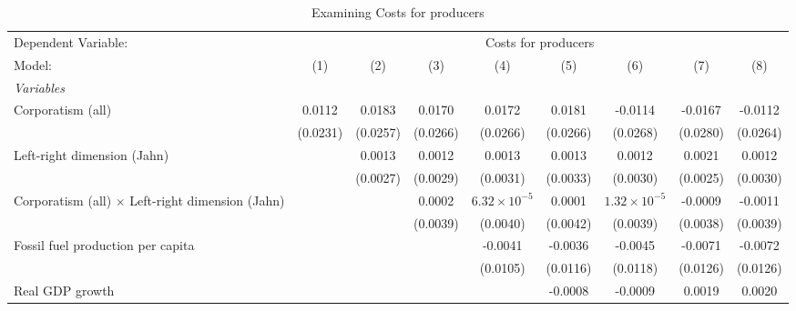 
\begin{table}[htbp]
   \caption{Examining Costs for producers}
   \centering
   \begin{tabular}{lcccccccc}
      \tabularnewline \midrule \midrule
      Dependent Variable: & \multicolumn{8}{c}{Costs for producers}\\
      Model:                                                  & (1)      & (2)      & (3)      & (4)                   & (5)      & (6)                   & (7)      & (8)\\  
      \midrule
      \emph{Variables}\\
      Corporatism (all)                                       & 0.0112   & 0.0183   & 0.0170   & 0.0172                & 0.0181   & -0.0114               & -0.0167  & -0.0112\\   
                                                              & (0.0231) & (0.0257) & (0.0266) & (0.0266)              & (0.0266) & (0.0268)              & (0.0280) & (0.0264)\\   
      Left-right dimension (Jahn)                             &          & 0.0013   & 0.0012   & 0.0013                & 0.0013   & 0.0012                & 0.0021   & 0.0012\\   
                                                              &          & (0.0027) & (0.0029) & (0.0031)              & (0.0033) & (0.0030)              & (0.0025) & (0.0030)\\   
      Corporatism (all) $\times$ Left-right dimension (Jahn)  &          &          & 0.0002   & $6.32\times 10^{-5}$  & 0.0001   & $1.32\times 10^{-5}$  & -0.0009  & -0.0011\\   
                                                              &          &          & (0.0039) & (0.0040)              & (0.0042) & (0.0039)              & (0.0038) & (0.0039)\\   
      Fossil fuel production per capita                       &          &          &          & -0.0041               & -0.0036  & -0.0045               & -0.0071  & -0.0072\\   
                                                              &          &          &          & (0.0105)              & (0.0116) & (0.0118)              & (0.0126) & (0.0126)\\   
      Real GDP growth                                         &          &          &          &                       & -0.0008  & -0.0009               & 0.0019   & 0.0020\\   

\end{tabular}
\end{table}
